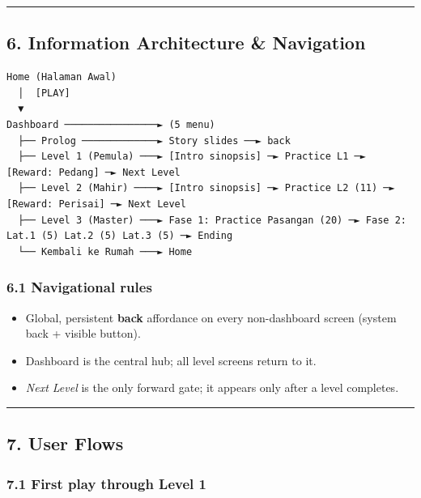 \documentclass[
  11pt,
]{article}
\providecommand{\tightlist}{%
  \setlength{\itemsep}{0pt}\setlength{\parskip}{0pt}}
\begin{document}
\begin{center}\rule{0.5\linewidth}{0.5pt}\end{center}

\subsection{6. Information Architecture \&
Navigation}\label{information-architecture-navigation}

\begin{verbatim}
Home (Halaman Awal)
  │  [PLAY]
  ▼
Dashboard ────────────────► (5 menu)
  ├── Prolog ─────────────► Story slides ──► back
  ├── Level 1 (Pemula) ───► [Intro sinopsis] ─► Practice L1 ─► [Reward: Pedang] ─► Next Level
  ├── Level 2 (Mahir) ────► [Intro sinopsis] ─► Practice L2 (11) ─► [Reward: Perisai] ─► Next Level
  ├── Level 3 (Master) ───► Fase 1: Practice Pasangan (20) ─► Fase 2: Lat.1 (5) Lat.2 (5) Lat.3 (5) ─► Ending
  └── Kembali ke Rumah ───► Home
\end{verbatim}

\subsubsection{6.1 Navigational rules}\label{navigational-rules}

\begin{itemize}
\tightlist
\item
  Global, persistent \textbf{back} affordance on every non-dashboard
  screen (system back + visible button).
\item
  Dashboard is the central hub; all level screens return to it.
\item
  \emph{Next Level} is the only forward gate; it appears only after a
  level completes.
\end{itemize}

\begin{center}\rule{0.5\linewidth}{0.5pt}\end{center}

\subsection{7. User Flows}\label{user-flows}

\subsubsection{7.1 First play through Level
1}\label{first-play-through-level-1}
\end{document}
